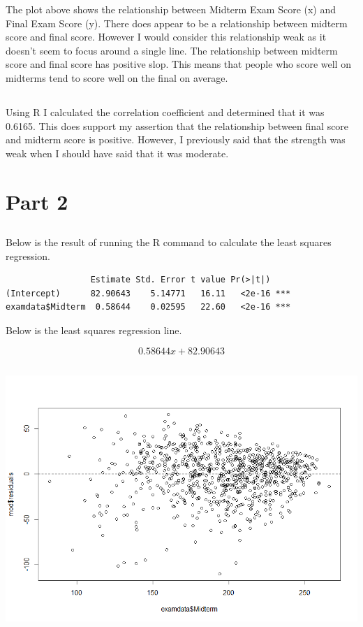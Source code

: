 \documentclass[letterpaper, onecolumn,10pt]{IEEEtran}
\begin{document}
            The plot above shows the relationship between Midterm Exam Score (x) and Final Exam Score (y). There does appear to be a relationship between midterm score and final score. However I would consider this relationship weak as it doesn't seem to focus around a single line. The relationship between midterm score and final score has positive slop. This means that people who score well on midterms tend to score well on the final on average.\\
            
            \subsection{}
            Using R I calculated the correlation coefficient and determined that it was 0.6165. This does support my assertion that the relationship between final score and midterm score is positive. However, I previously said that the strength was weak when I should have said that it was moderate.\\
        
        \section{Part 2}
            \subsection{}
            Below is the result of running the R command to calculate the least squares regression.
            \begin{lstlisting}
                 Estimate Std. Error t value Pr(>|t|)    
(Intercept)      82.90643    5.14771   16.11   <2e-16 ***
examdata$Midterm  0.58644    0.02595   22.60   <2e-16 ***
            \end{lstlisting}
            Below is the least squares regression line.
            
            \[
                0.58644x + 82.90643
            \]
            
            \subsection{}
            \includegraphics[width=\textwidth]{Week7/Images/residuals.png}
             
\end{document}
